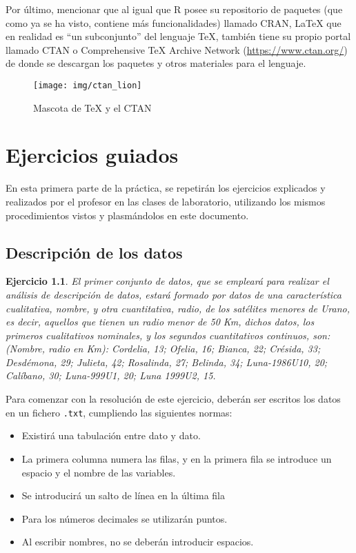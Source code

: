 \documentclass[12pt]{report}\usepackage[]{graphicx}\usepackage[dvipsnames]{xcolor}
\newtheorem{exercise}{Ejercicio}[section]
\begin{document}
			Por último, mencionar que al igual que R posee su repositorio de paquetes (que como ya se ha visto, contiene más funcionalidades) llamado CRAN, \LaTeX{} que en realidad es ``un subconjunto'' del lenguaje \TeX{}, también tiene su propio portal llamado CTAN o Comprehensive \TeX{} Archive Network (\url{https://www.ctan.org/}) de donde se descargan los paquetes y otros materiales para el lenguaje.
			
			\begin{figure}[H]
				\centering
				\texttt{[image: img/ctan\_lion]}
				\caption{Mascota de \TeX{} y el CTAN}
				\label{fig:leon}
			\end{figure}
			
	\chapter{Ejercicios guiados}\pagestyle{fancy}
	
		En esta primera parte de la práctica, se repetirán los ejercicios explicados y realizados por el profesor en las clases de laboratorio, utilizando los mismos procedimientos vistos y plasmándolos en este documento.
	
		\section{Descripción de los datos}
		
			\begin{exercise}
				El primer conjunto de datos, que se empleará para realizar el análisis de descripción de datos, estará formado por datos de una característica cualitativa, nombre, y otra cuantitativa, radio, de los satélites menores de Urano, es decir, aquellos que tienen un radio menor de 50 Km, dichos datos, los primeros cualitativos nominales, y los segundos cuantitativos continuos, son: (Nombre, radio en Km): Cordelia, 13; Ofelia, 16; Bianca, 22; Crésida, 33; Desdémona, 29; Julieta, 42; Rosalinda, 27; Belinda, 34; Luna-1986U10, 20; Calíbano, 30; Luna-999U1, 20; Luna 1999U2, 15.
			\end{exercise}
			
			Para comenzar con la resolución de este ejercicio, deberán ser escritos los datos en un fichero \texttt{.txt}, cumpliendo las siguientes normas:
			
			\begin{itemize}
				\item Existirá una tabulación entre dato y dato. 
				\item La primera columna numera las filas, y en la primera fila se introduce un espacio y el nombre de las variables. 
				\item Se introducirá un salto de línea en la última fila
				\item Para los números decimales se utilizarán puntos. 
				\item Al escribir nombres, no se deberán introducir espacios. 
			\end{itemize}
			
\end{document}
